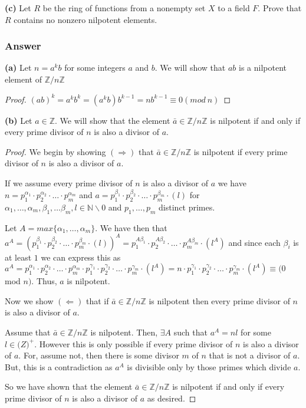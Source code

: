 \documentclass[12pt]{article}
\begin{document}
\textbf{(c)} Let $R$ be the ring of functions from a nonempty set $X$ to a field $F$. Prove that $R$ contains no nonzero nilpotent elements.

\subsubsection{Answer}

\textbf{(a)} Let $n=a^k b $ for some integers $a$ and $b$. We will show that  $ab$ is a nilpotent element of $\mathbb{Z} /n\mathbb{Z}$

\begin{proof} $(ab)^k = a^k b^k = (a^k b) b^{k-1} = n b^{k-1} \equiv 0 (mod\ n) $\end{proof}

\textbf{(b)}  Let $a \in \mathbb{Z}$. We will show that the element $\bar{a} \in \mathbb{Z} / n \mathbb{Z}$ is nilpotent if and only if every prime divisor of $n$ is also a divisor of $a$.


\begin{proof}
We begin by showing $(\Rightarrow)$ that $\bar{a} \in \mathbb{Z} / n \mathbb{Z}$ is nilpotent if every prime divisor of $n$ is also a divisor of $a$.

If we assume every prime divisor of $n$ is also a divisor of $a$ we have $n=p_1^{\alpha_1}\cdot p_2^{\alpha_2}\cdot \dots \cdot p_m^{\alpha_m}$ and $a=p_1^{\beta_1}\cdot p_2^{\beta_2}\cdot \dots \cdot p_m^{\beta_m}\cdot (l)$ for $\alpha_1, \dots, \alpha_m, \beta_1, \dots \beta_m, l \in \mathbb{N} \backslash 0$ and $p_1, \dots, p_m$ distinct primes.

Let $A = max\{\alpha_1, \dots , \alpha_m\}$. We have then that $a^A= (p_1^{\beta_1}\cdot p_2^{\beta_2}\cdot \dots \cdot p_m^{\beta_m}\cdot (l))^A= p_1^{A \beta_1}\cdot p_2^{A \beta_2}\cdot \dots \cdot p_m^{A \beta_m}\cdot (l^A)$ and since each $\beta_i$ is at least $1$ we can express this as $a^A =p_1^{\alpha_1}\cdot p_2^{\alpha_2}\cdot \dots \cdot p_m^{\alpha_m} \cdot p_1^{\gamma_1}\cdot p_2^{\gamma_2}\cdot \dots \cdot p_m^{\gamma_m}\cdot (l^A) =  n \cdot p_1^{\gamma_1}\cdot p_2^{\gamma_2}\cdot \dots \cdot p_m^{\gamma_m}\cdot (l^A) \equiv (0$ mod $n)$. Thus, $a$ is nilpotent.

Now we show $(\Leftarrow)$ that if $\bar{a} \in \mathbb{Z} / n \mathbb{Z}$ is nilpotent then every prime divisor of $n$ is also a divisor of $a$. 

Assume that $\bar{a} \in \mathbb{Z} / n \mathbb{Z}$ is nilpotent. Then, $\exists A$ such that $a^A = n l $ for some $l \in \mathbb(Z)^{+}$. However this is only possible if every prime divisor of $n$ is also a divisor of $a$. For, assume not, then there is some divisor $m$ of $n$ that is not a divisor of $a$. But, this is a contradiction as $a^A$ is divisible only by those primes which divide $a$. 

So we have shown  that the element $\bar{a} \in \mathbb{Z} / n \mathbb{Z}$ is nilpotent if and only if every prime divisor of $n$ is also a divisor of $a$ as desired. \end{proof}
\end{document}
